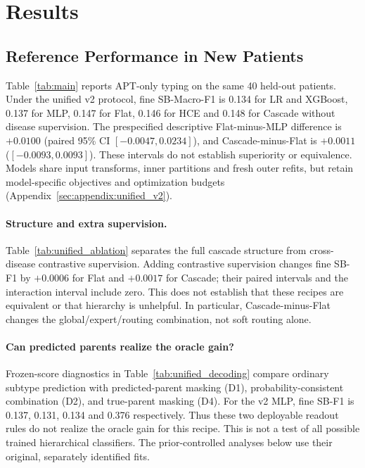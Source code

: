 \section{Results}
\label{sec:results}

\subsection{Reference Performance in New Patients}
\label{sec:results:subtype_audit}

Table~\ref{tab:main} reports APT-only typing on the same 40 held-out patients.
Under the unified v2 protocol, fine SB-Macro-F1 is 0.134 for LR and XGBoost,
0.137 for MLP, 0.147 for Flat, 0.146 for HCE and 0.148 for Cascade without
disease supervision. The prespecified descriptive Flat-minus-MLP difference
is $+0.0100$ (paired 95\% CI $[-0.0047,0.0234]$), and Cascade-minus-Flat is
$+0.0011$ ($[-0.0093,0.0093]$). These intervals do not establish superiority
or equivalence. Models share input transforms, inner partitions and fresh
outer refits, but retain model-specific objectives and optimization budgets
(Appendix~\ref{sec:appendix:unified_v2}).



\paragraph{Structure and extra supervision.}
Table~\ref{tab:unified_ablation} separates the full cascade structure from
cross-disease contrastive supervision. Adding contrastive supervision changes
fine SB-F1 by $+0.0006$ for Flat and $+0.0017$ for Cascade; their paired
intervals and the interaction interval include zero. This does not establish
that these recipes are equivalent or that hierarchy is unhelpful. In
particular, Cascade-minus-Flat changes the global/expert/routing combination,
not soft routing alone.


\paragraph{Can predicted parents realize the oracle gain?}
Frozen-score diagnostics in Table~\ref{tab:unified_decoding} compare ordinary
subtype prediction with predicted-parent masking (D1), probability-consistent
combination (D2), and true-parent masking (D4). For the v2 MLP, fine SB-F1 is
0.137, 0.131, 0.134 and 0.376 respectively. Thus these two deployable readout
rules do not realize the oracle gain for this recipe. This is not a test of
all possible trained hierarchical classifiers. The prior-controlled analyses
below use their original, separately identified fits.


